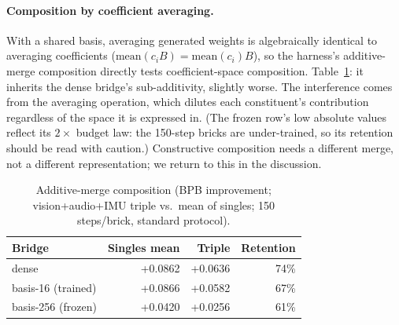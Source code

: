 \documentclass[11pt]{article}
\begin{document}
\paragraph{Composition by coefficient averaging.}
With a shared basis, averaging generated weights is algebraically identical to averaging coefficients ($\mathrm{mean}(c_i B) = \mathrm{mean}(c_i) B$), so the harness's additive-merge composition directly tests coefficient-space composition. Table~\ref{tab:compose}: it inherits the dense bridge's sub-additivity, slightly worse. The interference comes from the averaging operation, which dilutes each constituent's contribution regardless of the space it is expressed in. (The frozen row's low absolute values reflect its $2\times$ budget law: the 150-step bricks are under-trained, so its retention should be read with caution.) Constructive composition needs a different merge, not a different representation; we return to this in the discussion.

\begin{table}[t]
\centering
\caption{Additive-merge composition (BPB improvement; vision+audio+IMU triple vs.\ mean of singles; 150 steps/brick, standard protocol).}
\label{tab:compose}
\begin{tabular}{lrrr}
\toprule
Bridge & Singles mean & Triple & Retention \\
\midrule
dense & +0.0862 & +0.0636 & 74\% \\
basis-16 (trained) & +0.0866 & +0.0582 & 67\% \\
basis-256 (frozen) & +0.0420 & +0.0256 & 61\% \\
\bottomrule
\end{tabular}
\end{table}
\end{document}
